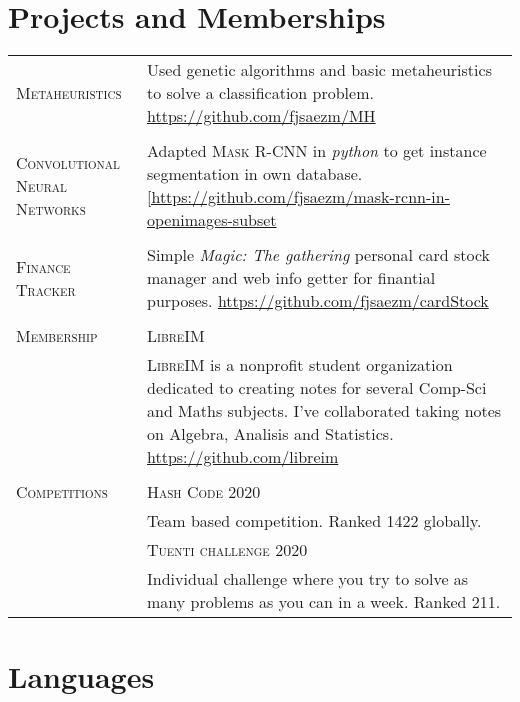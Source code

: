 \documentclass[a4paper,11pt]{article} %
\begin{document}
\section{Projects and Memberships}

\begin{tabular}{p{3cm}|p{11cm}}
  \textsc{Metaheuristics} & Used genetic algorithms and basic metaheuristics to solve a classification problem. \href{https://github.com/fjsaezm/MH}{https://github.com/fjsaezm/MH}\\ \\

  \textsc{Convolutional Neural Networks} & Adapted \textsc{Mask R-CNN} in \emph{python} to get instance segmentation in own database. \href{[https://github.com/fjsaezm/mask-rcnn-in-openimages-subset}{[https://github.com/fjsaezm/mask-rcnn-in-openimages-subset}\\ \\

      \textsc{Finance Tracker} & Simple \emph{Magic: The  gathering} personal card stock manager and web info getter for finantial purposes. \href{https://github.com/fjsaezm/cardStock}{https://github.com/fjsaezm/cardStock}\\ \\

      \textsc{Membership} & \textsc{LibreIM} \\
      & \textsc{LibreIM} is a nonprofit student organization dedicated to creating notes for several Comp-Sci and Maths subjects. I've collaborated taking notes on Algebra, Analisis and Statistics.
    \href{https://github.com/libreim}{https://github.com/libreim}\\ \\


    \textsc{Competitions} & \textsc{Hash Code 2020} \\ 
    & Team based competition. Ranked 1422 globally. \\ 
    & \textsc{Tuenti challenge 2020} \\ 
    & Individual challenge where you try to solve as many problems as you can in a week. Ranked 211.

\end{tabular}


\section{Languages}
\end{document}
